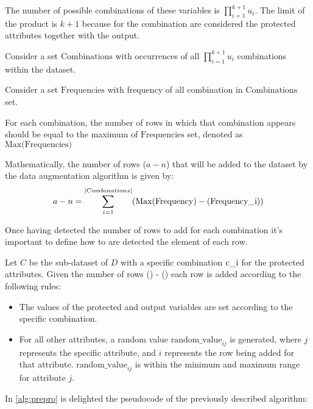 The number of possible combinations of these variables is $\prod_{i=1}^{k+1} u_i$. The limit of the product is ${k + 1}$ because for the combination are considered the protected attributes together with the output.

Consider a set $\text{Combinations}$ with occurrences of all $\prod_{i=1}^{k+1} u_i$ combinations within the dataset. 

Consider a set $\text{Frequencies}$ with frequency of all combination in $\text{Combinations}$ set.

For each combination, the number of rows in which that combination appears should be equal to the maximum of $\text{Frequencies}$ set, denoted as $\text{Max(Frequencies)}$

Mathematically, the number of rows ($a - n$) that will be added to the dataset by the data augmentation algorithm is given by:
\[
a - n = \sum_{i=1}^{|Combinations|}(\text{Max}(\text{Frequency}) - (\text{Frequency\textunderscore i}))
\]

Once having detected the number of rows to add for each combination it's important to define how to are detected the element of each row.

Let $C$ be the sub-dataset of $D$ with a specific combination $\text{c\textunderscore i}$ for the protected attributes. Given the number of rows () - () each row is added according to the following rules:

\begin{itemize}
    
    \item The values of the protected and output variables are set according to the specific combination.
   
    \item For all other attributes, a random value $\text{random\_value}_{ij}$ is generated, where $j$ represents the specific attribute, and $i$ represents the row being added for that attribute. $\text{random\_value}_{ij}$ is within the minimum and maximum range for attribute $j$.

\end{itemize}

In \cref{alg:prepro} is delighted the pseudocode of the previously described algorithm:

